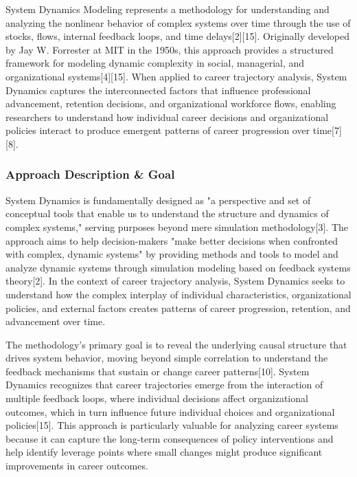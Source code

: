 \documentclass[main.tex]{subfiles}
\begin{document}
System Dynamics Modeling represents a methodology for understanding and analyzing the nonlinear behavior of complex systems over time through the use of stocks, flows, internal feedback loops, and time delays[2][15]. Originally developed by Jay W. Forrester at MIT in the 1950s, this approach provides a structured framework for modeling dynamic complexity in social, managerial, and organizational systems[4][15]. When applied to career trajectory analysis, System Dynamics captures the interconnected factors that influence professional advancement, retention decisions, and organizational workforce flows, enabling researchers to understand how individual career decisions and organizational policies interact to produce emergent patterns of career progression over time[7][8].

\subsubsection{Approach Description \& Goal}

System Dynamics is fundamentally designed as "a perspective and set of conceptual tools that enable us to understand the structure and dynamics of complex systems," serving purposes beyond mere simulation methodology[3]. The approach aims to help decision-makers "make better decisions when confronted with complex, dynamic systems" by providing methods and tools to model and analyze dynamic systems through simulation modeling based on feedback systems theory[2]. In the context of career trajectory analysis, System Dynamics seeks to understand how the complex interplay of individual characteristics, organizational policies, and external factors creates patterns of career progression, retention, and advancement over time.

The methodology's primary goal is to reveal the underlying causal structure that drives system behavior, moving beyond simple correlation to understand the feedback mechanisms that sustain or change career patterns[10]. System Dynamics recognizes that career trajectories emerge from the interaction of multiple feedback loops, where individual decisions affect organizational outcomes, which in turn influence future individual choices and organizational policies[15]. This approach is particularly valuable for analyzing career systems because it can capture the long-term consequences of policy interventions and help identify leverage points where small changes might produce significant improvements in career outcomes.
\end{document}
